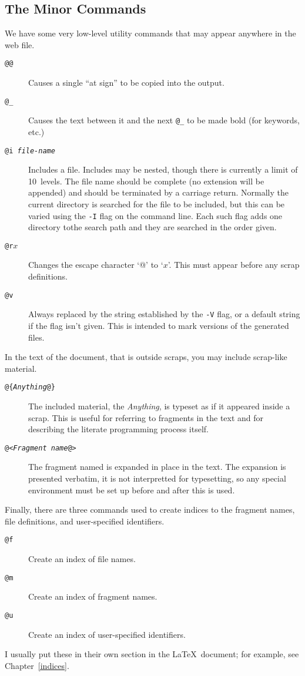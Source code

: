 \documentclass[a4paper]{report}
\begin{document}
\subsection{The Minor Commands\label{minorcommands}}

We have some very low-level utility commands that may appear anywhere
in the web file.
\begin{description}
\item[\tt @@] Causes a single ``at sign'' to be copied into the output.
\item[\tt @\_] Causes the text between it and the next {\tt @\_}
      to be made bold (for keywords, etc.)
\item[\tt @i {\em file-name\/}] Includes a file. Includes may be
  nested, though there is currently a limit of 10~levels. The file name
  should be complete (no extension will be appended) and should be
  terminated by a carriage return. Normally the current directory is
  searched for the file to be included, but this can be varied using
  the \verb|-I| flag on the command line. Each such flag adds one
  directory tothe search path and they are searched in the order
  given.
\item[{\tt @r}$x$] Changes the escape character `@' to `$x$'.
  This must appear before any scrap definitions.
\item[\tt @v] Always replaced by the string established by
the \texttt{-V} flag, or a default string if the flag isn't
given. This is intended to mark versions of the generated
files.
\end{description}

In the text of the document, that is outside scraps, you may include
scrap-like material.

\begin{description}
\item[\tt @\{\textit{Anything}@\}]
The included material, the \textit{Anything},
is typeset as if it appeared inside a scrap. This is useful for
referring to fragments in the text and for
describing the literate programming process itself.
\item[\tt @<\textit{Fragment name}@>]
The fragment named is expanded in place in the text.
The expansion is presented verbatim, it is not interpretted for
typesetting, so any special environment must be set up before and
after this is used.
\end{description}

Finally, there are three commands used to create indices to the
fragment
names, file definitions, and user-specified identifiers.
\begin{description}
\item[\tt @f] Create an index of file names.
\item[\tt @m] Create an index of fragment names.
\item[\tt @u] Create an index of user-specified identifiers.
\end{description}
I usually put these in their own section
in the \LaTeX\ document; for example, see Chapter~\ref{indices}.
\end{document}

